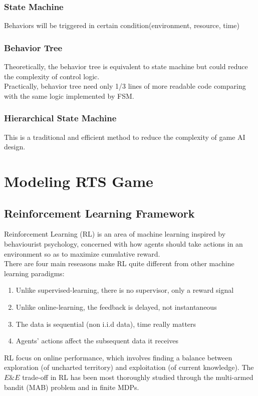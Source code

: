 \documentclass[sigconf]{acmart}
\begin{document}
\subsubsection{State Machine}
Behaviors will be triggered in certain condition(environment, resource, time)

\subsubsection{Behavior Tree}
Theoretically, the behavior tree is equivalent to state machine but could reduce the complexity of control logic.\\
Practically, behavior tree need only 1/3 lines of more readable code  comparing with the same logic implemented by FSM.

\subsubsection{Hierarchical State Machine}
This is a traditional and efficient method to reduce the complexity of game AI design.

\section{Modeling RTS Game}
\subsection{Reinforcement Learning Framework}
Reinforcement Learning (RL) is an area of machine learning inspired by behaviourist psychology, concerned with how agents should take actions in an environment so as to maximize cumulative reward.\\
There are four main reseasons make RL quite different from other machine learning paradigms\cite{David_Silver:intro_RL}:
\begin{enumerate}
\item Unlike supervised-learning, there is no supervisor, only a reward signal
\item Unlike online-learning, the feedback is delayed, not instantaneous
\item The data is sequential (non i.i.d data), time really matters
\item Agents' actions affect the subsequent data it receives
\end{enumerate}
RL focus on online performance, which involves finding a balance between exploration (of uncharted territory) and exploitation (of current knowledge). The $E\&E$ trade-off in RL has been most thoroughly studied through the multi-armed bandit (MAB) problem and in finite MDPs.
\end{document}
